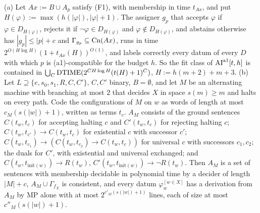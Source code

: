 \begin{proposition}\label{prop:time:aone}
(a) Let $Ax:=B\cup A_p$ satisfy (F1), with membership in time $t_{Ax}$, and put $H(\varphi):=\max(h(|\varphi|),|\varphi|+1)$. The assigner $g_p$ that accepts $\varphi$ if $\varphi\in D_{H(\varphi)}$, rejects it if $\neg\varphi\in D_{H(\varphi)}$ and $\varphi\notin D_{H(\varphi)}$, and abstains otherwise has $|g_p|\le|p|+c$ and $\Gamma_{g_p}\subseteq\mathrm{Cn}(Ax)$, runs in time $2^{O(H\log H)}(1+t_{Ax}(H))^{O(1)}$, and labels correctly every datum of every $D$ with which $p$ is (a1)-compatible for the budget $h$. So the fit class of $\mathrm{AI}^{\mathrm{a1}}[t,h]$ is contained in $\bigcup_C\mathrm{DTIME}(2^{CH\log H}(t(H)+1)^C)$, $H:=h(m+2)+m+3$.
(b) Let $L\supseteq\{e,s_0,s_1,R,C,C'\}$, $C,C'$ binary, $B=\emptyset$, and let $M$ be an alternating machine with branching at most $2$ that decides $X$ in space $s(m)\ge m$ and halts on every path. Code the configurations of $M$ on $w$ as words of length at most $c_M(s(|w|)+1)$, written as terms $t_c$. $A_M$ consists of the ground sentences $C(t_w,t_c)$ for accepting halting $c$ and $C'(t_w,t_c)$ for rejecting halting $c$; $C(t_w,t_{c'})\to C(t_w,t_c)$ for existential $c$ with successor $c'$; $C(t_w,t_{c_1})\to(C(t_w,t_{c_2})\to C(t_w,t_c))$ for universal $c$ with successors $c_1,c_2$; the duals for $C'$, with existential and universal exchanged; and $C(t_w,t_{\mathrm{init}(w)})\to R(t_w)$, $C'(t_w,t_{\mathrm{init}(w)})\to\neg R(t_w)$. Then $A_M$ is a set of sentences with membership decidable in polynomial time by a decider of length $|M|+c$, $A_M\cup\Gamma_{f_X}$ is consistent, and every datum $\varphi_w^{[w\in X]}$ has a derivation from $A_M$ by MP alone with at most $2^{c'_M(s(|w|)+1)}$ lines, each of size at most $c''_M(s(|w|)+1)$.
\end{proposition}

